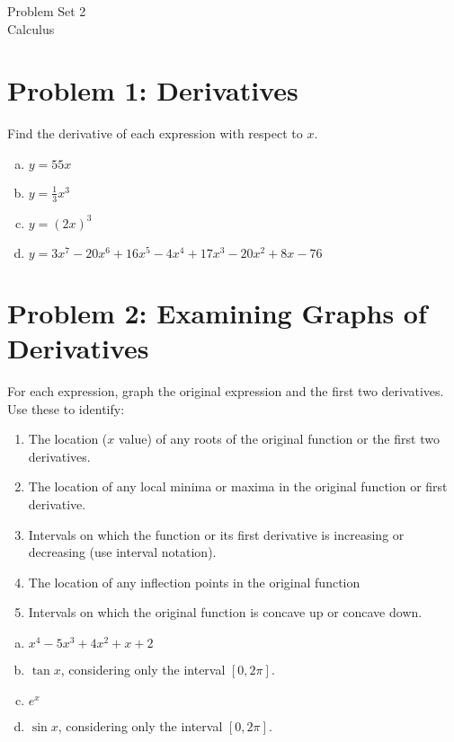 \documentclass[11pt]{article}
\theoremstyle{definition}
\theoremstyle{remark}
\begin{document}
\begin{center}
{\huge Problem Set 2}\\[5pt]
{\Large Calculus}
\end{center}

\section*{Problem 1: Derivatives}
 Find the derivative of each expression with respect to $x$.
\begin{enumerate}[(a)]
\item $ \displaystyle y=55x$
\item $ \displaystyle y=\frac{1}{3}x^3$
\item $ \displaystyle y=(2x)^3$
\item $ \displaystyle y= 3x^7 - 20x^6 + 16x^5 - 4x^4 + 17x^3 - 20x^2 + 8x - 76$
\end{enumerate}

\section*{Problem 2: Examining Graphs of Derivatives}
 
For each expression, graph the original expression and the first two derivatives. Use these to identify:
\begin{enumerate}
	\item The location ($x$ value) of any roots of the original function or the first two derivatives.
	\item The location of any local minima or maxima in the original function or first derivative.
    \item Intervals on which the function or its first derivative is increasing or decreasing (use interval notation).
    \item The location of any inflection points in the original function
    \item Intervals on which the original function is concave up or concave down.

\end{enumerate}
\begin{enumerate}[(a)]
\item $ \displaystyle x^4-5x^3+4x^2+x+2$
\item $ \displaystyle \tan x$, considering only the interval $[0,2\pi]$.
\item $ \displaystyle e^x$
\item $ \displaystyle \sin x$, considering only the interval $[0,2\pi]$.
\end{enumerate}
\end{document}
